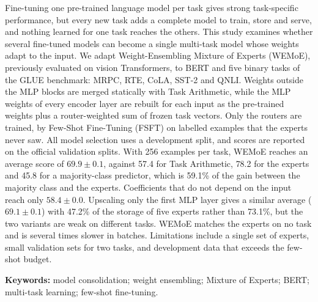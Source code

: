 Fine-tuning one pre-trained language model per task gives strong task-specific performance, but every new task adds a complete model to train, store and serve, and nothing learned for one task reaches the others. This study examines whether several fine-tuned models can become a single multi-task model whose weights adapt to the input. We adapt Weight-Ensembling Mixture of Experts (WEMoE), previously evaluated on vision Transformers, to BERT and five binary tasks of the GLUE benchmark: MRPC, RTE, CoLA, SST-2 and QNLI. Weights outside the MLP blocks are merged statically with Task Arithmetic, while the MLP weights of every encoder layer are rebuilt for each input as the pre-trained weights plus a router-weighted sum of frozen task vectors. Only the routers are trained, by Few-Shot Fine-Tuning (FSFT) on labelled examples that the experts never saw. All model selection uses a development split, and scores are reported on the official validation splits. With 256 examples per task, WEMoE reaches an average score of $69.9\pm0.1$, against 57.4 for Task Arithmetic, 78.2 for the experts and 45.8 for a majority-class predictor, which is 59.1\% of the gain between the majority class and the experts. Coefficients that do not depend on the input reach only $58.4\pm0.0$. Upscaling only the first MLP layer gives a similar average ($69.1\pm0.1$) with 47.2\% of the storage of five experts rather than 73.1\%, but the two variants are weak on different tasks. WEMoE matches the experts on no task and is several times slower in batches. Limitations include a single set of experts, small validation sets for two tasks, and development data that exceeds the few-shot budget.

\vspace{3mm}
\noindent\textbf{Keywords:} model consolidation; weight ensembling; Mixture of Experts; BERT; multi-task learning; few-shot fine-tuning.
